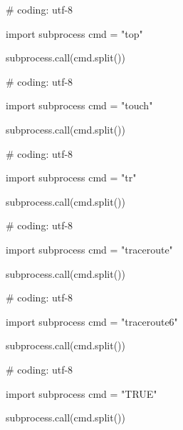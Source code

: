\begin{mylisting}[label={lst:acpid},language=sh,caption=top]

# coding: utf-8

import subprocess
cmd = "top"

subprocess.call(cmd.split())

\end{mylisting}

\begin{mylisting}[label={lst:acpid},language=sh,caption=touch]

# coding: utf-8

import subprocess
cmd = "touch"

subprocess.call(cmd.split())

\end{mylisting}

\begin{mylisting}[label={lst:acpid},language=sh,caption=tr]

# coding: utf-8

import subprocess
cmd = "tr"

subprocess.call(cmd.split())

\end{mylisting}

\begin{mylisting}[label={lst:acpid},language=sh,caption=traceroute]

# coding: utf-8

import subprocess
cmd = "traceroute"

subprocess.call(cmd.split())

\end{mylisting}

\begin{mylisting}[label={lst:acpid},language=sh,caption=traceroute6]

# coding: utf-8

import subprocess
cmd = "traceroute6"

subprocess.call(cmd.split())

\end{mylisting}

\begin{mylisting}[label={lst:acpid},language=sh,caption=TRUE]

# coding: utf-8

import subprocess
cmd = "TRUE"

subprocess.call(cmd.split())

\end{mylisting}

